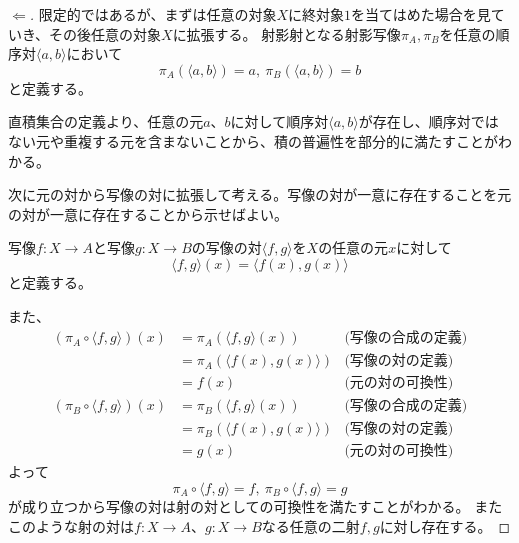 \documentclass[uplatex,dvipdfmx]{jsarticle}
\newcommand{\arrow}{\rightarrow}
\newcommand{\tuple}[1]{\langle #1\rangle}
\newcommand{\mor}[3]{#1:#2\arrow #3}
\newtheorem{proof}{証明}[section]
\numberwithin{proof}{subsection}
\begin{document}
	\begin{proof}[$\Longleftarrow$]
		限定的ではあるが、まずは任意の対象$X$に終対象$1$を当てはめた場合を見ていき、その後任意の対象$X$に拡張する。
		射影射となる射影写像$\pi_A,\pi_B$を任意の順序対$\tuple{a,b}$において\[\pi_A(\tuple{a,b})=a,\ \pi_B(\tuple{a,b})=b\]と定義する。

		直積集合の定義より、任意の元$a$、$b$に対して順序対$\tuple{a,b}$が存在し、順序対ではない元や重複する元を含まないことから、積の普遍性を部分的に満たすことがわかる。
		\begin{center}
		\end{center}
		次に元の対から写像の対に拡張して考える。写像の対が一意に存在することを元の対が一意に存在することから示せばよい。

		写像$\mor{f}{X}{A}$と写像$\mor{g}{X}{B}$の写像の対$\tuple{f,g}$を$X$の任意の元$x$に対して\[\tuple{f,g}(x)=\tuple{f(x),g(x)}\]と定義する。

		また、
		\begin{align*}
			(\pi_A\circ\tuple{f,g})(x)&=\pi_A(\tuple{f,g}(x))&\text{(写像の合成の定義)}\\
			&=\pi_A(\tuple{f(x),g(x)})&\text{(写像の対の定義)}\\
			&=f(x)&\text{(元の対の可換性)}\\
			(\pi_B\circ\tuple{f,g})(x)&=\pi_B(\tuple{f,g}(x))&\text{(写像の合成の定義)}\\
			&=\pi_B(\tuple{f(x),g(x)})&\text{(写像の対の定義)}\\
			&=g(x)&\text{(元の対の可換性)}
		\end{align*}
		よって\[\pi_A\circ\tuple{f,g}=f,\ \pi_B\circ\tuple{f,g}=g\]が成り立つから写像の対は射の対としての可換性を満たすことがわかる。
		またこのような射の対は$\mor{f}{X}{A}$、$\mor{g}{X}{B}$なる任意の二射$f,g$に対し存在する。


\end{proof}
\end{document}
